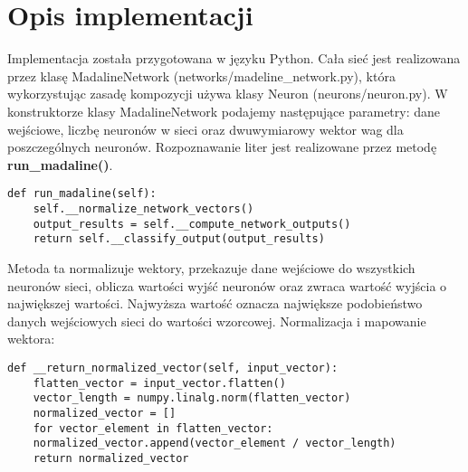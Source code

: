 \documentclass{classrep}
\begin{document}
\section{Opis implementacji}
{Implementacja została przygotowana w języku Python. Cała sieć jest realizowana przez klasę MadalineNetwork (networks\slash madeline{\_}network.py), która wykorzystując zasadę kompozycji używa klasy Neuron (neurons/neuron.py). W konstruktorze klasy MadalineNetwork podajemy następujące parametry:
dane wejściowe, liczbę neuronów w sieci oraz dwuwymiarowy wektor wag dla poszczególnych neuronów.
Rozpoznawanie liter jest realizowane przez metodę \textbf{run{\_}madaline()}. 
\begin{lstlisting}
def run_madaline(self):
	self.__normalize_network_vectors()
	output_results = self.__compute_network_outputs()
	return self.__classify_output(output_results)
\end{lstlisting}
Metoda ta normalizuje wektory, przekazuje dane wejściowe do wszystkich neuronów sieci, oblicza wartości wyjść neuronów oraz zwraca wartość wyjścia o największej wartości. Najwyższa wartość oznacza największe podobieństwo danych wejściowych sieci do wartości wzorcowej.
Normalizacja i mapowanie wektora:
\begin{lstlisting}
def __return_normalized_vector(self, input_vector):
	flatten_vector = input_vector.flatten()
	vector_length = numpy.linalg.norm(flatten_vector)
	normalized_vector = []
	for vector_element in flatten_vector:
	normalized_vector.append(vector_element / vector_length)
	return normalized_vector
\end{lstlisting}
}
\end{document}

